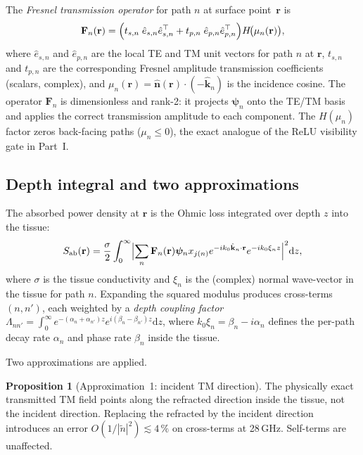 \documentclass[11pt,a4paper]{article}
\theoremstyle{definition}
\newtheorem{proposition}[proposition]{Proposition}
\newcommand{\nhat}{\hat{\bm{n}}}
\newcommand{\Sab}{S_{\mathrm{ab}}}
\newcommand{\ntilde}{\tilde{n}}
\newcommand{\diff}{\mathrm{d}}
\begin{document}
The \emph{Fresnel transmission operator} for path $n$ at surface
point~$\mathbf{r}$ is
\begin{equation}\label{eq:Fn}
  \mathbf{F}_n(\mathbf{r}) =
  \Bigl(
    t_{s,n}\;\hat{e}_{s,n}\hat{e}_{s,n}^\top
    + t_{p,n}\;\hat{e}_{p,n}\hat{e}_{p,n}^\top
  \Bigr)H\!\bigl(\mu_n(\mathbf{r})\bigr),
\end{equation}
where $\hat{e}_{s,n}$ and $\hat{e}_{p,n}$ are the local TE and TM unit
vectors for path $n$ at $\mathbf{r}$, $t_{s,n}$ and $t_{p,n}$ are the
corresponding Fresnel amplitude transmission coefficients (scalars,
complex), and $\mu_n(\mathbf{r})=\nhat(\mathbf{r})\cdot(-\hat{\mathbf{k}}_n)$
is the incidence cosine.  The operator $\mathbf{F}_n$ is dimensionless
and rank-2: it projects $\boldsymbol{\psi}_n$ onto the TE/TM basis and
applies the correct transmission amplitude to each component.  The
$H(\mu_n)$ factor zeros back-facing paths ($\mu_n\le 0$), the exact
analogue of the ReLU visibility gate in Part~I.

\subsection{Depth integral and two approximations}

The absorbed power density at $\mathbf{r}$ is the Ohmic loss integrated
over depth $z$ into the tissue:
\begin{equation}\label{eq:Sab-depth}
  \Sab(\mathbf{r}) = \frac{\sigma}{2}\int_0^\infty
  \Bigl|\sum_n \mathbf{F}_n(\mathbf{r})\boldsymbol{\psi}_n
    x_{j(n)} e^{-ik_0\hat{\mathbf{k}}_n\cdot\mathbf{r}}
    e^{-ik_0\xi_n z}\Bigr|^2\diff z,
\end{equation}
where $\sigma$ is the tissue conductivity and $\xi_n$ is the (complex)
normal wave-vector in the tissue for path $n$.  Expanding the squared
modulus produces cross-terms $(n,n')$, each weighted by a
\emph{depth coupling factor} $\Lambda_{nn'}=\int_0^\infty
e^{-(\alpha_n+\alpha_{n'})z}e^{i(\beta_n-\beta_{n'})z}\diff z$, where
$k_0\xi_n=\beta_n-i\alpha_n$ defines the per-path decay rate $\alpha_n$
and phase rate $\beta_n$ inside the tissue.

Two approximations are applied.

\begin{proposition}[Approximation~1: incident TM direction]
The physically exact transmitted TM field points along the refracted
direction inside the tissue, not the incident direction.  Replacing
the refracted by the incident direction introduces an error
$O(1/|\ntilde|^2)\lesssim 4\,\%$ on cross-terms at 28\,GHz.  Self-terms
are unaffected.
\end{proposition}
\end{document}
